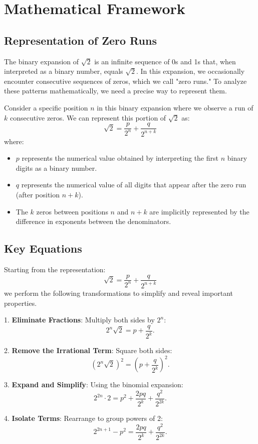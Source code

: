 \section{Mathematical Framework}

\subsection{Representation of Zero Runs}
The binary expansion of $\sqrt{2}$ is an infinite sequence of 0s and 1s that, when interpreted as a binary number, equals $\sqrt{2}$. In this expansion, we occasionally encounter consecutive sequences of zeros, which we call "zero runs." To analyze these patterns mathematically, we need a precise way to represent them.

Consider a specific position $n$ in this binary expansion where we observe a run of $k$ consecutive zeros. We can represent this portion of $\sqrt{2}$ as:
\[
\sqrt{2} = \frac{p}{2^n} + \frac{q}{2^{n+k}}
\]
where:
\begin{itemize}
    \item $p$ represents the numerical value obtained by interpreting the first $n$ binary digits as a binary number.
    \item $q$ represents the numerical value of all digits that appear after the zero run (after position $n+k$).
    \item The $k$ zeros between positions $n$ and $n+k$ are implicitly represented by the difference in exponents between the denominators.
\end{itemize}

\subsection{Key Equations}
Starting from the representation:
\[
\sqrt{2} = \frac{p}{2^n} + \frac{q}{2^{n+k}}
\]
we perform the following transformations to simplify and reveal important properties.

1. \textbf{Eliminate Fractions}: Multiply both sides by $2^n$:
\[
2^n \sqrt{2} = p + \frac{q}{2^k}.
\]

2. \textbf{Remove the Irrational Term}: Square both sides:
\[
(2^n \sqrt{2})^2 = \left(p + \frac{q}{2^k}\right)^2.
\]

3. \textbf{Expand and Simplify}: Using the binomial expansion:
\[
2^{2n} \cdot 2 = p^2 + \frac{2pq}{2^k} + \frac{q^2}{2^{2k}}.
\]

4. \textbf{Isolate Terms}: Rearrange to group powers of 2:
\[
2^{2n+1} - p^2 = \frac{2pq}{2^k} + \frac{q^2}{2^{2k}}.
\]

